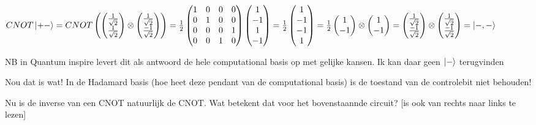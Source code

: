 \documentclass[a4paper, addpoints, 12pt
    , answers    %
    ]{exam}
\begin{document}
\begin{questions}
$
CNOT\ket{+-}=CNOT
\begin{pmatrix}
\begin{pmatrix}
\tfrac{1}{\sqrt{2}}\\
\tfrac{1}{\sqrt{2}}
\end{pmatrix}
\otimes
\begin{pmatrix}
\tfrac{1}{\sqrt{2}}\\
\tfrac{-1}{\sqrt{2}}
\end{pmatrix}
\end{pmatrix}
=
\frac{1}{2}
\begin{pmatrix}
1&0&0&0\\
0&1&0&0\\
0&0&0&1\\
0&0&1&0\\
\end{pmatrix}
\begin{pmatrix}
1\\
-1\\
1\\
-1
\end{pmatrix}
=
\frac{1}{2}
\begin{pmatrix}
1\\
-1\\
-1\\
1
\end{pmatrix}
=
\frac{1}{2}
\begin{pmatrix}
1\\
-1
\end{pmatrix}
\otimes
\begin{pmatrix}
1\\
-1
\end{pmatrix}
=
\begin{pmatrix}
\tfrac{1}{\sqrt{2}}\\
\tfrac{-1}{\sqrt{2}}
\end{pmatrix}
\otimes
\begin{pmatrix}
\tfrac{1}{\sqrt{2}}\\
\tfrac{-1}{\sqrt{2}}
\end{pmatrix}
=
\ket{-,-}
$

NB in Quantum inspire levert dit als antwoord de hele computational basis op met gelijke kansen. Ik kan daar geen $\ket{-}$ terugvinden

Nou dat is wat! In de Hadamard basis (hoe heet deze pendant van de computational basis) is de toestand van de controlebit niet behouden!

Nu is de inverse van een CNOT natuurlijk de CNOT. Wat betekent dat voor het bovenstaannde circuit?
[is ook van rechts naar links te lezen]


\end{questions}
\end{document}
